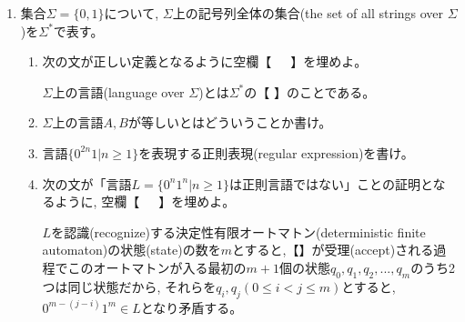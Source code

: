 \documentclass[dvipdfmx,titlepage, 11pt, a4paper]{jsarticle}%
\begin{document}
\begin{enumerate}[(1)]
  \setlength{\itemsep}{10pt}  
\item 集合$\Sigma=\{0,1\}$について, $\Sigma$上の記号列全体の集合(the set of all strings over $\Sigma$)を$\Sigma^{\ast}$で表す。
  \begin{enumerate}[(${1}-$a)]
    \setlength{\itemsep}{15pt}   
  \item 次の文が正しい定義となるように空欄【\ \ \ 】を埋めよ。
    \begin{center}
      $\Sigma$上の言語(language over $\Sigma$)とは$\Sigma^{\ast}$の【\hspace{20pt} 】のことである。
    \end{center}
  \item $\Sigma$上の言語$A,B$が等しいとはどういうことか書け。
  \item 言語$\{0^{2n}1|n\geq 1\}$を表現する正則表現(regular expression)を書け。
  \item 次の文が「言語$L=\{0^{n}1^{n}|n\geq 1\}$は正則言語ではない」ことの証明となるように, 空欄【\ \ \ 】を埋めよ。\\[0.5cm]
    \begin{minipage}{13cm}
      $L$を認識(recognize)する決定性有限オートマトン(deterministic finite automaton)の状態(state)の数を$m$とすると,【\hspace{20pt}】が受理(accept)される過程でこのオートマトンが入る最初の$m+1$個の状態$q_{0},q_{1},q_{2},...,q_{m}$のうち2つは同じ状態だから, それらを$q_{i},q_{j}(0\leq i<j\leq m)$とすると, $0^{m-(j-i)}1^{m}\in L$となり矛盾する。
    \end{minipage}
  \end{enumerate}
  \hspace{1cm}
  

\end{enumerate}
\end{document}
